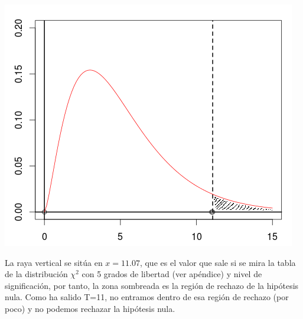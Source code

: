 \documentclass[nochap]{apuntes}
\begin{document}
\begin{example}
\begin{enumerate}
\includegraphics[scale=0.75]{img/ejemploEstadistica.png}

La raya vertical se sitúa en $x=11.07$, que es el valor que sale si se mira la tabla de la distribución $\chi^2$ con 5 grados de libertad (ver apéndice) y nivel de significación, por tanto, la zona sombreada es la región de rechazo de la hipótesis nula. Como ha salido T=11, no entramos dentro de esa región de rechazo (por poco) y no podemos rechazar la hipótesis nula.

\end{enumerate}
\end{example}
\end{document}

